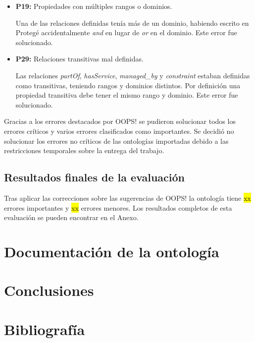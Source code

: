 \documentclass[a4paper,12pt]{article}
\begin{document}
	\begin{itemize}
		\item \textbf{P19:} Propiedades con múltiples rangos o dominios.
		
		Una de las relaciones definidas tenía más de un dominio, habiendo escrito en Protegé accidentalmente \textit{and} en lugar de \textit{or} en el dominio. Este error fue solucionado.
		\item \textbf{P29:} Relaciones transitivas mal definidas.
		
		Las relaciones \textit{partOf}, \textit{hasService}, \textit{managed\_by} y \textit{constraint} estaban definidas como transitivas, teniendo rangos y dominios distintos. Por definición una propiedad transitiva debe tener el mismo rango y dominio. Este error fue solucionado.
	\end{itemize}
	
	Gracias a los errores destacados por OOPS! se pudieron solucionar todos los errores críticos y varios errores clasificados como importantes. Se decidió no solucionar los errores no críticos de las ontologías importadas debido a las restricciones temporales sobre la entrega del trabajo.
	
	\subsection{Resultados finales de la evaluación}
	
	Tras aplicar las correcciones sobre las sugerencias de OOPS! la ontología tiene \hl{xx} errores importantes y \hl{xx} errores menores.
	Los resultados completos de esta evaluación se pueden encontrar en el Anexo.
	
	\section{Documentación de la ontología}
		
	\cite{widoco}
	
	
	\section{Conclusiones}
	
	
\newpage
	\section*{Bibliografía}
	
	
	
\end{document}
